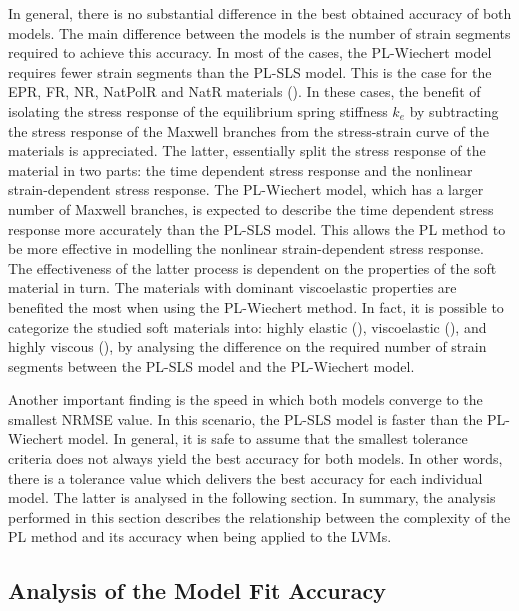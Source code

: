 In general, there is no substantial difference in the best obtained accuracy of both models. The main difference between the models is the number of strain segments required to achieve this accuracy. In most of the cases, the PL-Wiechert model requires fewer strain segments than the PL-SLS model. This is the case for the EPR, FR, NR, NatPolR and NatR materials (). In these cases, the benefit of isolating the stress response of the equilibrium spring stiffness $k_e$ by subtracting the stress response of the Maxwell branches from the stress-strain curve of the materials is appreciated. The latter, essentially split the stress response of the material in two parts: the time dependent stress response and the nonlinear strain-dependent stress response. The PL-Wiechert model, which has a larger number of Maxwell branches, is expected to describe the time dependent stress response more accurately than the PL-SLS model. This allows the PL method to be more effective in modelling the nonlinear strain-dependent stress response. The effectiveness of the latter process is dependent on the properties of the soft material in turn. The materials with dominant viscoelastic properties are benefited the most when using the PL-Wiechert method. In fact, it is possible to categorize the studied soft materials into: highly elastic (), viscoelastic (), and highly viscous (), by analysing the difference on the required number of strain segments between the PL-SLS model and the PL-Wiechert model.

Another important finding is the speed in which both models converge to the smallest NRMSE value. In this scenario, the PL-SLS model is faster than the PL-Wiechert model. In general, it is safe to assume that the smallest tolerance criteria does not always yield the best accuracy for both models. In other words, there is a tolerance value which delivers the best accuracy for each individual model. The latter is analysed in the following section. In summary, the analysis performed in this section describes the relationship between the complexity of the PL method and its accuracy when being applied to the LVMs. 


\subsection{Analysis of the Model Fit Accuracy} \label{ModelfitAnalysis}

